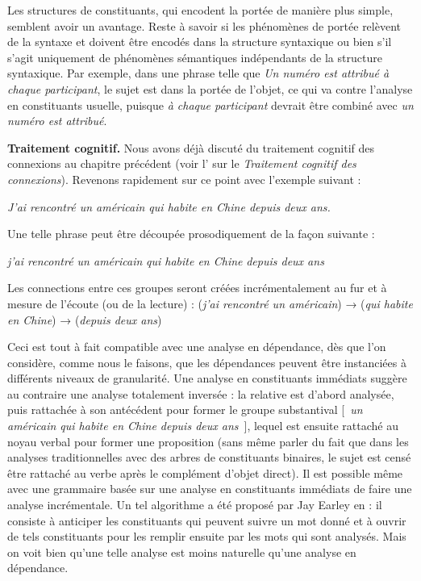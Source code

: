 {    Les structures de constituants, qui encodent la portée de manière plus simple, semblent avoir un avantage. Reste à savoir si les phénomènes de portée relèvent de la syntaxe et doivent être encodés dans la structure syntaxique ou bien s’il s’agit uniquement de phénomènes sémantiques indépendants de la structure syntaxique. Par exemple, dans une phrase telle que \textit{Un numéro est attribué à chaque participant}, le sujet est dans la portée de l’objet, ce qui va contre l’analyse en constituants usuelle, puisque \textit{à chaque participant} devrait être combiné avec \textit{un numéro est attribué}.

    \smallskip\noindent\textbf{Traitement cognitif.}
    Nous avons déjà discuté du traitement cognitif des connexions au chapitre précédent (voir l' sur le \textit{Traitement cognitif des connexions}). Revenons rapidement sur ce point avec l’exemple suivant :

    \ea
    \textit{{J’ai rencontré un américain qui habite en Chine depuis deux ans.}}
    \z

    Une telle phrase peut être découpée prosodiquement de la façon suivante :

    \ea
    \textit{{j’ai rencontré un américain}} {\textbar} \textit{qui habite en Chine} {\textbar} \textit{depuis deux ans}
    \z

    Les connections entre ces groupes seront créées incrémentalement au fur et à mesure de l’écoute (ou de la lecture) :
    \ea
    (\textit{j’ai rencontré un américain}) \textrm{→} (\textit{qui habite en Chine}) \textrm{→} (\textit{depuis deux ans})
    \z

    Ceci est tout à fait compatible avec une analyse en dépendance, dès que l'on considère, comme nous le faisons, que les dépendances peuvent être instanciées à différents niveaux de granularité. Une analyse en constituants immédiats suggère au contraire une analyse totalement inversée : la relative est d’abord analysée, puis rattachée à son antécédent pour former le groupe substantival [~\textit{un américain qui habite en Chine depuis deux ans}~], lequel est ensuite rattaché au noyau verbal pour former une proposition (sans même parler du fait que dans les analyses traditionnelles avec des arbres de constituants binaires, le sujet est censé être rattaché au verbe après le complément d’objet direct).
    Il est possible même avec une grammaire basée sur une analyse en constituants immédiats de faire une analyse incrémentale. Un tel algorithme a été proposé par Jay Earley en \citeyear{earley1970efficient} : il consiste à anticiper les constituants qui peuvent suivre un mot donné et à ouvrir de tels constituants pour les remplir ensuite par les mots qui sont analysés. Mais on voit bien qu’une telle analyse est moins naturelle qu’une analyse en dépendance.
}
